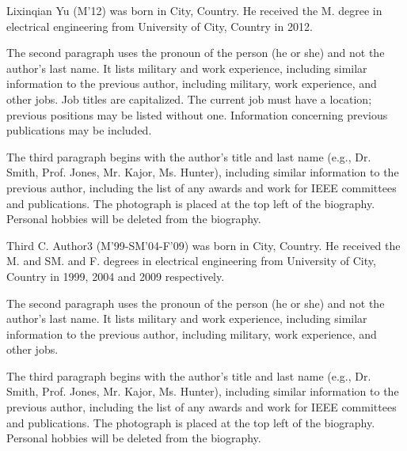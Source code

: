 \documentclass[journal]{IEEEtranTICPS}
\begin{document}
\begin{IEEEbiography}
{Lixinqian Yu} (M'12) was born in City, Country. He received the M. degree in electrical engineering from University of City, Country in 2012.

The second paragraph uses the pronoun of the person (he or she) and not the author's last name. It lists military and work experience, including similar information to the previous author, including military, work experience, and other jobs. Job titles are capitalized. The current job must have a location; previous positions may be listed without one. Information concerning previous publications may be included.

The third paragraph begins with the author's title and last name (e.g., Dr. Smith, Prof. Jones, Mr. Kajor, Ms. Hunter), including similar information to the previous author, including the list of any awards and work for IEEE committees and publications. The photograph is placed at the top left of the biography. Personal hobbies will be deleted from the 
biography.
\end{IEEEbiography}

\begin{IEEEbiography}
{Third C. Author3} (M'99-SM'04-F'09) was born in City, Country. He received the M. and SM. and F. degrees in electrical engineering from University of City, Country in 1999, 2004 and 2009 respectively.

The second paragraph uses the pronoun of the person (he or she) and not the author's last name. It lists military and work experience, including similar information to the previous author, including military, work experience, and other jobs.

The third paragraph begins with the author's title and last name (e.g., Dr. Smith, Prof. Jones, Mr. Kajor, Ms. Hunter), including similar information to the previous author, including the list of any awards and work for IEEE committees and publications. The photograph is placed at the top left of the biography. Personal hobbies will be deleted from the biography.
\end{IEEEbiography}
\end{document}
